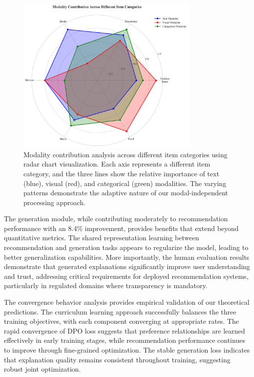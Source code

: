\documentclass[pdflatex,sn-mathphys-num]{sn-jnl}%
\theoremstyle{thmstyleone}%
\theoremstyle{thmstyletwo}%
\theoremstyle{thmstylethree}%
\begin{document}
\begin{figure}[t]
\centering
\includegraphics[width=0.8\textwidth]{figures/modality_contribution_radar.pdf}
\caption{Modality contribution analysis across different item categories using radar chart visualization. Each axis represents a different item category, and the three lines show the relative importance of text (blue), visual (red), and categorical (green) modalities. The varying patterns demonstrate the adaptive nature of our modal-independent processing approach.}
\label{fig:modality_contribution}
\end{figure}

The generation module, while contributing moderately to recommendation performance with an 8.4\% improvement, provides benefits that extend beyond quantitative metrics. The shared representation learning between recommendation and generation tasks appears to regularize the model, leading to better generalization capabilities. More importantly, the human evaluation results demonstrate that generated explanations significantly improve user understanding and trust, addressing critical requirements for deployed recommendation systems, particularly in regulated domains where transparency is mandatory.

The convergence behavior analysis provides empirical validation of our theoretical predictions. The curriculum learning approach successfully balances the three training objectives, with each component converging at appropriate rates. The rapid convergence of DPO loss suggests that preference relationships are learned effectively in early training stages, while recommendation performance continues to improve through fine-grained optimization. The stable generation loss indicates that explanation quality remains consistent throughout training, suggesting robust joint optimization.
\end{document}
